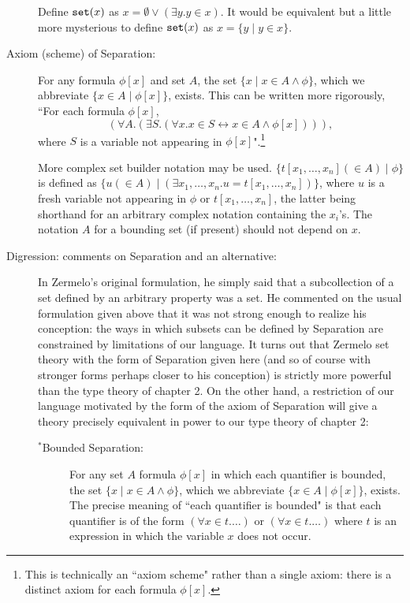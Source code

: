 \documentclass[12pt]{book}
\begin{document}
\begin{description}
Define ${\tt set}(x)$ as $x=\emptyset \vee (\exists y.y \in x)$.  It would be equivalent but a little more mysterious to define ${\tt set}(x)$ as $x=\{y \mid y\in x\}$.

\item[Axiom (scheme) of Separation:] For any formula $\phi[x]$ and set $A$, the set $\{x \mid x \in A \wedge \phi\}$, which we abbreviate $\{x
\in A \mid \phi[x]\}$, exists.  This can be written more rigorously, ``For each formula $\phi[x]$, $$(\forall A.(\exists S.(\forall x.x \in S \leftrightarrow x \in A \wedge \phi[x]))),$$ where $S$ is a variable not appearing in $\phi[x]$".\footnote{This is technically an ``axiom scheme" rather than a single axiom:  there is a distinct axiom for each formula $\phi[x]$.}

More complex set builder notation may be used.  $\{t[x_1,\ldots,x_n] (\in A) \mid \phi\}$ is defined as $\{u (\in A) \mid (\exists x_1,\ldots,x_n.u=t[x_1,\ldots,x_n])\}$, where $u$ is a fresh variable not appearing in $\phi$ or $t[x_1,\ldots,x_n]$, the latter being shorthand for an arbitrary complex notation containing the $x_i$'s.  The notation $A$ for a bounding set (if present) should not depend on $x$.

\item[Digression: comments on Separation and an alternative:]

In Zermelo's original formulation, he simply said that a subcollection of a set defined by an arbitrary property was a set.  He commented on the usual formulation given above that it was not strong enough to realize his conception:  the ways in which subsets can be defined by Separation are constrained by limitations of our language.  It turns out that Zermelo set theory with the form of Separation given here (and so of course with stronger forms perhaps closer to his conception) is strictly more powerful than the type theory of chapter 2.  On the other hand, a restriction of our language motivated by the form of the axiom of Separation will give a theory precisely equivalent in power to our type theory of chapter 2:

\begin{description}

\item[$^*$Bounded Separation:]  For any set $A$ formula $\phi[x]$ in which each quantifier is bounded, the set $\{x \mid x \in A \wedge \phi\}$, which we abbreviate $\{x
\in A \mid \phi[x]\}$, exists.   The precise meaning of ``each quantifier is bounded" is that each quantifier is of the form $(\forall x \in t.\ldots)$ or $(\forall x \in t.\ldots)$ where $t$ is an expression in which the variable $x$ does not occur.


\end{description}
\end{description}
\end{document}
